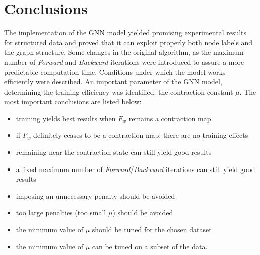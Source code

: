 
\chapter{Conclusions}
The implementation of the GNN model yielded promising experimental results for structured data and proved that it can exploit properly both node labels and the graph structure. Some changes in the original algorithm, as the maximum number of \emph{Forward} and \emph{Backward} iterations were introduced to assure a more predictable computation time. Conditions under which the model works efficiently were described. An important parameter of the GNN model, determining the training efficiency was identified: the contraction constant $\mu$. The most important conclusions are listed below:
\begin{itemize}
	\item training yields best results when $F_w$ remains a contraction map
	\item if $F_w$ definitely ceases to be a contraction map, there are no training effects
	\item remaining near the contraction state can still yield good results
	\item a fixed maximum number of \emph{Forward}/\emph{Backward} iterations can still yield good results
	\item imposing an unnecessary penalty should be avoided
	\item too large penalties (too small $\mu$) should be avoided
	\item the minimum value of $\mu$ should be tuned for the chosen dataset
	\item the minimum value of $\mu$ can be tuned on a subset of the data.
\end{itemize}
